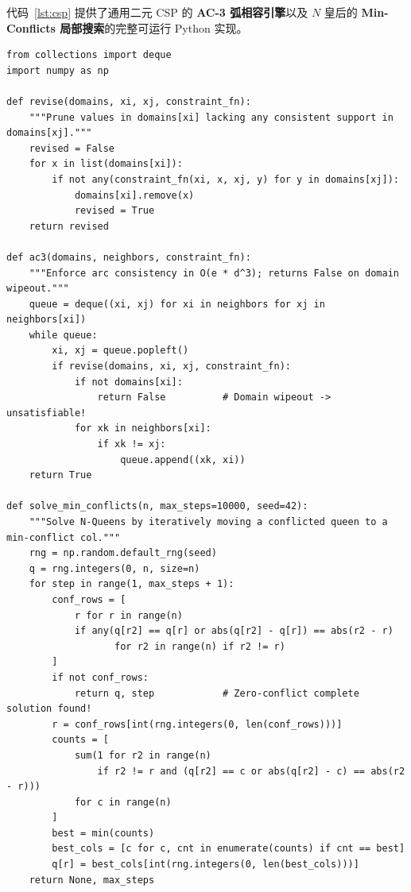 代码~\ref{lst:csp} 提供了通用二元 CSP 的 \textbf{AC-3 弧相容引擎}以及 $N$ 皇后的 \textbf{Min-Conflicts 局部搜索}的完整可运行 Python 实现。

\begin{lstlisting}[caption={通用二元 CSP 的 AC-3 弧相容算法与 $N$ 皇后 Min-Conflicts 完整实现},label={lst:csp}]
from collections import deque
import numpy as np

def revise(domains, xi, xj, constraint_fn):
    """Prune values in domains[xi] lacking any consistent support in domains[xj]."""
    revised = False
    for x in list(domains[xi]):
        if not any(constraint_fn(xi, x, xj, y) for y in domains[xj]):
            domains[xi].remove(x)
            revised = True
    return revised

def ac3(domains, neighbors, constraint_fn):
    """Enforce arc consistency in O(e * d^3); returns False on domain wipeout."""
    queue = deque((xi, xj) for xi in neighbors for xj in neighbors[xi])
    while queue:
        xi, xj = queue.popleft()
        if revise(domains, xi, xj, constraint_fn):
            if not domains[xi]:
                return False          # Domain wipeout -> unsatisfiable!
            for xk in neighbors[xi]:
                if xk != xj:
                    queue.append((xk, xi))
    return True

def solve_min_conflicts(n, max_steps=10000, seed=42):
    """Solve N-Queens by iteratively moving a conflicted queen to a min-conflict col."""
    rng = np.random.default_rng(seed)
    q = rng.integers(0, n, size=n)
    for step in range(1, max_steps + 1):
        conf_rows = [
            r for r in range(n)
            if any(q[r2] == q[r] or abs(q[r2] - q[r]) == abs(r2 - r)
                   for r2 in range(n) if r2 != r)
        ]
        if not conf_rows:
            return q, step            # Zero-conflict complete solution found!
        r = conf_rows[int(rng.integers(0, len(conf_rows)))]
        counts = [
            sum(1 for r2 in range(n)
                if r2 != r and (q[r2] == c or abs(q[r2] - c) == abs(r2 - r)))
            for c in range(n)
        ]
        best = min(counts)
        best_cols = [c for c, cnt in enumerate(counts) if cnt == best]
        q[r] = best_cols[int(rng.integers(0, len(best_cols)))]
    return None, max_steps
\end{lstlisting}

